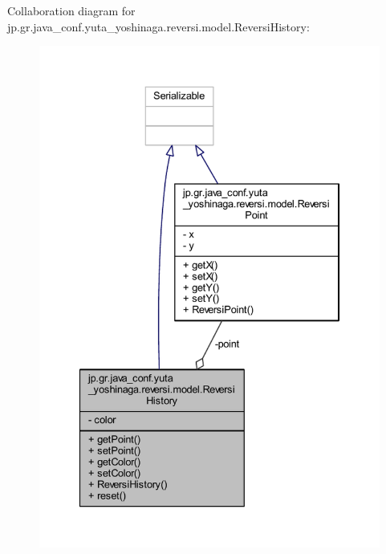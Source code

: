 Collaboration diagram for jp.\+gr.\+java\+\_\+conf.\+yuta\+\_\+yoshinaga.\+reversi.\+model.\+Reversi\+History\+:\nopagebreak
\begin{figure}[H]
\begin{center}
\leavevmode
\includegraphics[width=334pt]{classjp_1_1gr_1_1java__conf_1_1yuta__yoshinaga_1_1reversi_1_1model_1_1_reversi_history__coll__graph}
\end{center}
\end{figure}
